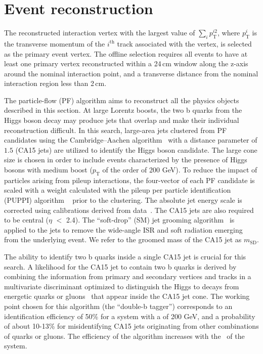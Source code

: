 


\section{Event reconstruction}

The reconstructed interaction vertex with the largest value of $\sum_{i} p_\mathrm{T}^{i2}$, where $p_\mathrm{T}^{i}$ is the transverse momentum of the $i^\mathrm{th}$ track 
associated with the vertex, is selected as the primary event vertex. The offline selection requires all events to have at least one primary vertex reconstructed within a 24\,cm window along the z-axis around the nominal interaction point, and a transverse distance from the nominal interaction region less than 2\,cm.

The particle-flow (PF) \cite{Sirunyan:2017ulk} algorithm aims to reconstruct all the physics objects described in this section. At large Lorentz boosts, the two b quarks from the Higgs boson decay may produce jets that overlap and make their individual reconstruction difficult. In this search, large-area jets clustered from PF candidates using the Cambridge--Aachen algorithm~\cite{cajets} with a distance parameter of $1.5$ (CA15 jets) are utilized to identify the Higgs boson candidate.  The large cone size is chosen in order to include events characterized by the presence of Higgs bosons with medium boost ($p_\mathrm{T}$ of the order of 200 GeV).
To reduce the impact of particles arising from pileup interactions,  the four-vector of each PF candidate is scaled with a weight calculated with the pileup per particle identification (PUPPI) algorithm ~\cite{puppi} prior to the clustering.
The absolute jet energy scale is corrected using calibrations derived from data~\cite{jec}. The CA15 jets are also required to be central ($\eta$ $<$ 2.4).
The ``soft-drop'' (SM) jet grooming algorithm~\cite{msd} is applied to the jets to remove the wide-angle ISR and soft radiation emerging from the underlying event. We refer to the groomed mass of the CA15 jet as $m_\text{SD}$. 

The ability to identify two b quarks inside a single CA15 jet is
crucial for this search. A likelihood for the CA15 jet to contain two
b quarks is derived by combining the information from primary and secondary vertices and tracks in a multivariate discriminant optimized to distinguish the Higgs to \bb decays from energetic quarks or gluons~\cite{Sirunyan:2017ezt} that appear inside the CA15 jet cone.
The working point chosen for this algorithm (the ``double-b tagger'')
corresponds to an identification efficiency of 50\% for a \bb system
with a \pt of 200 GeV, and a probability of about 10-13\% for
misidentifying CA15 jets originating from other combinations of quarks
or gluons. The efficiency of the algorithm increases with the \pt~of the \bb system.

